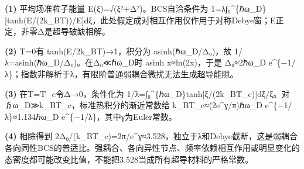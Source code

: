 \par\noindent\textbf{(1)} 平均场准粒子能量 E(ξ)=√(ξ²+Δ²)。BCS自洽条件为 1=λ∫₀\textasciicircum{}\{ℏω\_D\}[tanh(E/(2k\_BT))/E]dξ，此处假定成对相互作用仅作用于对称Debye窗；E正定，非零Δ是超导破缺相解。
\par\noindent\textbf{(2)} T=0有 tanh(E/2k\_BT)→1，积分为 asinh(ℏω\_D/Δ₀)，故 1/λ=asinh(ℏω\_D/Δ₀)。在Δ₀≪ℏω\_D时 asinh x≈ln(2x)，于是 Δ₀≈2ℏω\_D e\textasciicircum{}\{−1/λ\}；指数非解析于λ，有限阶普通弱耦合微扰无法生成超导能隙。
\par\noindent\textbf{(3)} 在T=T\_c令Δ→0，条件化为 1/λ=∫₀\textasciicircum{}\{ℏω\_D\}tanh[ξ/(2k\_BT\_c)]dξ/ξ。对ℏω\_D≫k\_BT\_c，标准热积分的渐近常数给 k\_BT\_c≈(2e\textasciicircum{}γ/π)ℏω\_D e\textasciicircum{}\{−1/λ\}≈1.134ℏω\_D e\textasciicircum{}\{−1/λ\}，其中γ为Euler常数。
\par\noindent\textbf{(4)} 相除得到 2Δ₀/(k\_BT\_c)=2π/e\textasciicircum{}γ≈3.528，独立于λ和Debye截断，这是弱耦合各向同性BCS的普适比。强耦合、各向异性节点、频率依赖相互作用或明显变化的态密度都可能改变比值，不能把3.528当成所有超导材料的严格常数。

